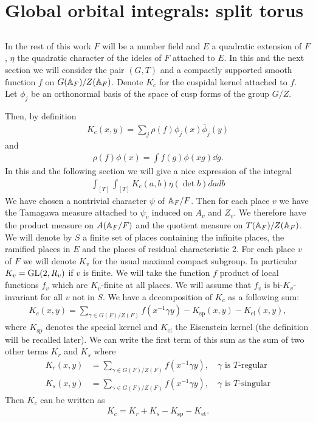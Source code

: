 \section{Global orbital integrals: split torus}

\subsection{}
In the rest of this work $F$ will be a number field and $E$ a quadratic extension of $F$, $\eta$ the quadratic character of the ideles of $F$ attached to $E$.
In this and the next section we will consider the pair $(G, T)$ and a compactly supported smooth function $f$ on $G(\mathbb{A}_F) /Z(\mathbb{A}_F)$.
Denote $K_c$ for the cuspidal kernel attached to $f$.
Let $\phi_j$ be an orthonormal basis of the space of cusp forms of the group $G/Z$.

Then, by definition
\begin{align}
    K_c(x, y) = \sum_{j} \rho(f) \phi_{j}(x) \overline{\phi}_{j}(y)
\end{align}
and
\begin{align}
    \rho(f) \phi(x) = \int f(g) \phi(xg) \dd g.
\end{align}
In this and the following section we will give a nice expression of the integral
\begin{align}
    \int_{[T]} \int_{[T]} K_c(a, b) \eta(\det b) da db
\end{align}
We have chosen a nontrivial character $\psi$ of $\mathbb{A}_F / F$.
Then for each place $v$ we have the Tamagawa measure attached to $\psi_v$ induced on $A_v$ and $Z_v$.
We therefore have the product measure on $A(\mathbb{A}_F/F)$ and the quotient measure on $T(\mathbb{A}_F) / Z(\mathbb{A}_F)$.
We will denote by $S$ a finite set of places containing the infinite places, the ramified places in $E$ and the places of residual characteristic 2.
For each place $v$ of $F$ we will denote $K_v$ for the usual maximal compact subgroup.
In particular $K_v = \mathrm{GL}(2, R_v)$ if $v$ is finite.
We will take the function $f$ product of local functions $f_v$ which are $K_v$-finite at all places.
We will assume that $f_v$ is bi-$K_v$-invariant for all $v$ not in $S$.
We have a decomposition of $K_c$ as a following sum:
\begin{align}
    K_c(x, y) = \sum_{\gamma \in G(F) / Z(F)} f(x^{-1}\gamma y) - K_{\mathrm{sp}}(x, y) - K_{\mathrm{ei}}(x, y),
\end{align}
where $K_{\mathrm{sp}}$ denotes the special kernel and $K_{\mathrm{ei}}$ the Eisenstein kernel (the definition will be recalled later).
We can write the first term of this sum as the sum of two other terms $K_r$ and $K_s$ where
\begin{align}
    K_{r}(x, y) &= \sum_{\gamma \in G(F) / Z(F)} f(x^{-1}\gamma y), \quad \gamma\text{ is }T\text{-regular} \\
    K_{s}(x, y) &= \sum_{\gamma \in G(F) / Z(F)} f(x^{-1}\gamma y), \quad \gamma\text{ is }T\text{-singular}
\end{align}
Then $K_c$ can be written as
\begin{align}
    K_c = K_r + K_s - K_{\mathrm{sp}} - K_{\mathrm{et}}.
\end{align}

